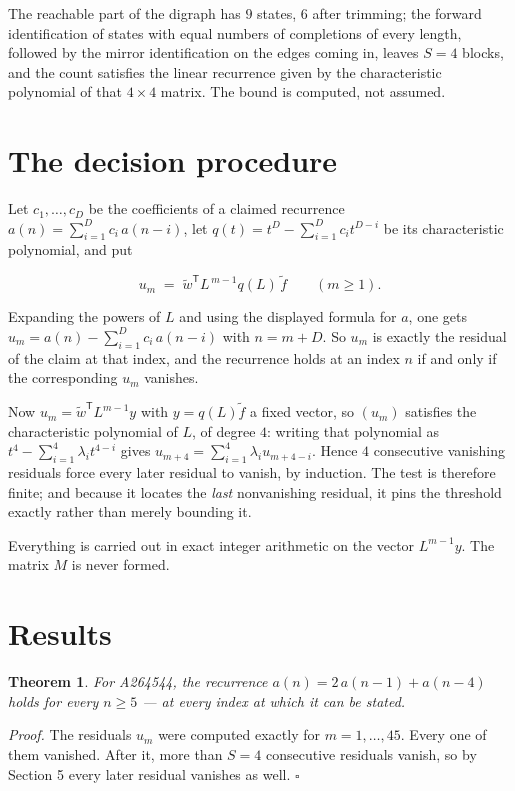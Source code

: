 \documentclass[11pt]{article}
\newtheorem{theorem}{Theorem}
\theoremstyle{definition}
\begin{document}
The reachable part of the digraph has $9$ states, $6$ after trimming; the forward identification of states with equal numbers of completions of every length, followed by the mirror identification on the edges coming in, leaves $S = 4$ blocks, and the count satisfies the linear recurrence given by the characteristic polynomial of that $4\times4$ matrix. The bound is computed, not assumed.

\section{The decision procedure}

Let $c_1,\dots,c_D$ be the coefficients of a claimed recurrence $a(n) = \sum_{i=1}^{D} c_i\,a(n-i)$, let $q(t) = t^{D} - \sum_{i=1}^{D} c_i t^{D-i}$ be its characteristic polynomial, and put

\[u_m \;=\; \tilde w^{\mathsf T} L^{\,m-1} q(L)\,\tilde f \qquad (m \ge 1).\]

Expanding the powers of $L$ and using the displayed formula for $a$, one gets $u_m = a(n) - \sum_{i=1}^{D} c_i\,a(n-i)$ with $n = m + D$. So $u_m$ is exactly the residual of the claim at that index, and the recurrence holds at an index $n$ if and only if the corresponding $u_m$ vanishes.

Now $u_m = \tilde w^{\mathsf T} L^{m-1} y$ with $y = q(L)\tilde f$ a fixed vector, so $(u_m)$ satisfies the characteristic polynomial of $L$, of degree $4$: writing that polynomial as $t^{4} - \sum_{i=1}^{4} \lambda_i t^{4-i}$ gives $u_{m+4} = \sum_{i=1}^{4} \lambda_i u_{m+4-i}$. Hence $4$ consecutive vanishing residuals force every later residual to vanish, by induction. The test is therefore finite; and because it locates the {\itshape last} nonvanishing residual, it pins the threshold exactly rather than merely bounding it.

Everything is carried out in exact integer arithmetic on the vector $L^{m-1}y$. The matrix $M$ is never formed.

\section{Results}

\begin{theorem} For A264544, the recurrence $a(n) = 2\,a(n-1) + a(n-4)$ holds for every $n \ge 5$ --- at every index at which it can be stated.\end{theorem}

{\itshape Proof.} The residuals $u_m$ were computed exactly for $m = 1,\dots,45$. Every one of them vanished. After it, more than $S = 4$ consecutive residuals vanish, so by Section 5 every later residual vanishes as well. $\square$
\end{document}

